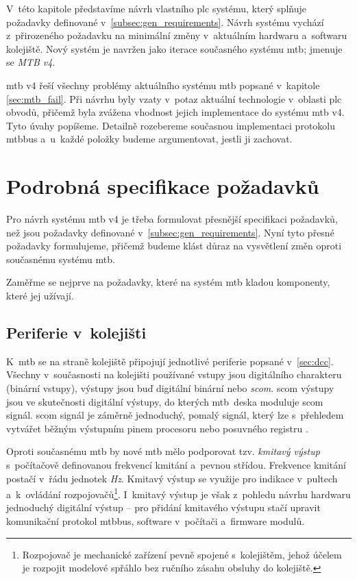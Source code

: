 V~této kapitole představíme návrh vlastního \gls{plc} systému, který
splňuje požadavky definované v~\ref{subsec:gen_requirements}. Návrh systému
vychází z~přirozeného požadavku na minimální změny v~aktuálním hardwaru
a~softwaru kolejiště. Nový systém je navržen jako iterace současného systému
\gls{mtb}; jmenuje se \textit{MTB v4}.

\gls{mtb} v4 řeší všechny problémy aktuálního systému \gls{mtb} popsané
v~kapitole \ref{sec:mtb_fail}. Při návrhu byly vzaty v~potaz aktuální
technologie v~oblasti \gls{plc} obvodů, přičemž byla zvážena vhodnost jejich
implementace do systému \gls{mtb} v4. Tyto úvahy popíšeme. Detailně rozebereme
současnou implementaci protokolu \gls{mtbbus} a~u~každé položky budeme
argumentovat, jestli ji zachovat.

\section{Podrobná specifikace požadavků}

Pro návrh systému \gls{mtb} v4 je třeba formulovat přesnější specifikaci
požadavků, než jsou požadavky definované v~\ref{subsec:gen_requirements}. Nyní
tyto přesné požadavky formulujeme, přičemž budeme klást důraz na vysvětlení
změn oproti současnému systému \gls{mtb}.

Zaměřme se nejprve na požadavky, které na systém \gls{mtb} kladou komponenty,
které jej užívají.

\subsection{Periferie v~kolejišti}

K~\gls{mtb} se na straně kolejiště připojují jednotlivé periferie popsané
v~\ref{sec:dcc}. Všechny v~současnosti na kolejišti používané vstupy jsou
digitálního charakteru (binární vstupy), výstupy jsou buď digitální binární
nebo \textit{\gls{scom}}. \gls{scom} výstupy jsou ve skutečnosti digitální
výstupy, do kterých \gls{mtb} deska moduluje \gls{scom} signál. \gls{scom}
signál je záměrně jednoduchý, pomalý signál, který lze s~přehledem vytvářet
běžným výstupním pinem procesoru nebo posuvného registru \cite{scom-specs}.

Oproti současnému \gls{mtb} by nové \gls{mtb} mělo podporovat tzv. \textit{kmitavý
výstup} s~počítačově definovanou frekvencí kmitání a~pevnou střídou. Frekvence
kmitání postačí v~řádu jednotek \textit{Hz}. Kmitavý výstup se využije pro
indikace v~pultech a~k~ovládání rozpojovačů\footnote{Rozpojovač je mechanické
zařízení pevně spojené s~kolejištěm, jehož účelem je rozpojit modelové spřáhlo
bez ručního zásahu obsluhy do kolejiště.}. I~kmitavý výstup je však z~pohledu
návrhu hardwaru jednoduchý digitální výstup – pro přidání kmitavého výstupu
stačí upravit komunikační protokol \gls{mtbbus}, software v~počítači a~firmware
modulů.

